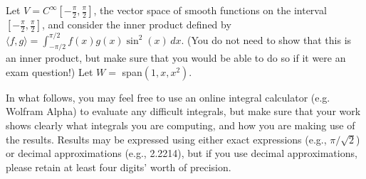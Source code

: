 \documentclass[12pt]{exam}
\begin{document}
\begin{questions}
\question Let $V = C^\infty \left[ -\frac{\pi}{2}, \frac{\pi}{2}\right]$, the vector space of smooth functions on the interval $\left[ -\frac{\pi}{2}, \frac{\pi}{2}\right]$, and consider the inner product defined by $\langle f, g\rangle = \int_{-\pi/2}^{\pi/2} f (x)g(x) \sin^2(x) \, dx$. (You do not need to show that this is an inner product, but make sure that you would be able to do so if it were an exam question!) Let $W = $ span$(1, x, x^2)$.
\par In what follows, you may feel free to use an online integral calculator (e.g. Wolfram Alpha) to evaluate any difficult integrals, but make sure that your work shows clearly what integrals you are computing, and how you are making use of the results. Results may be expressed using either exact expressions (e.g., $\pi/\sqrt2$) or decimal approximations (e.g., 2.2214), but if you use decimal approximations, please retain at least four digits' worth of precision.
    \begin{parts}

\end{parts}
\end{questions}
\end{document}

